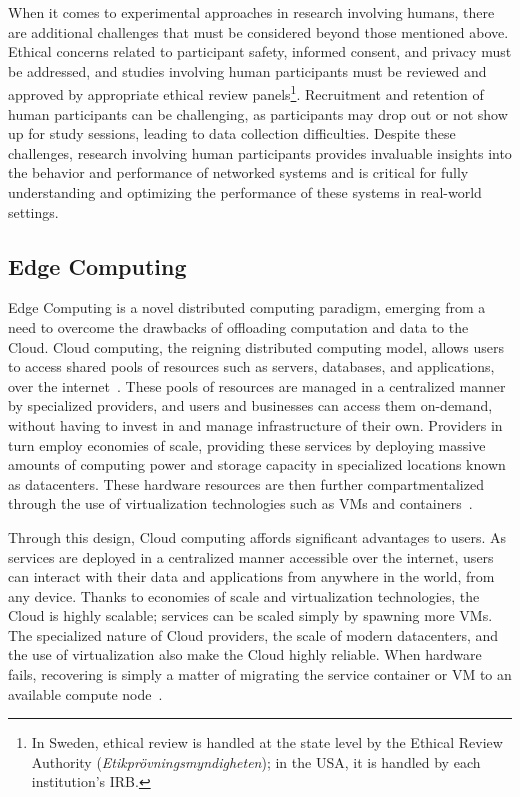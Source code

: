 When it comes to experimental approaches in research involving humans, there are additional challenges that must be considered beyond those mentioned above.
Ethical concerns related to participant safety, informed consent, and privacy must be addressed, and studies involving human participants must be reviewed and approved by appropriate ethical review panels\footnote{%
    In Sweden, ethical review is handled at the state level by the Ethical Review Authority (\emph{Etikprövningsmyndigheten}); in the \acs{USA}, it is handled by each institution's \gls{IRB}.
}.
Recruitment and retention of human participants can be challenging, as participants may drop out or not show up for study sessions, leading to data collection difficulties.
Despite these challenges, research involving human participants provides invaluable insights into the behavior and performance of networked systems and is critical for fully understanding and optimizing the performance of these systems in real-world settings.

\subsection{Edge Computing}

Edge Computing is a novel distributed computing paradigm, emerging from a need to overcome the drawbacks of offloading computation and data to the Cloud.
Cloud computing, the reigning distributed computing model, allows users to access shared pools of resources such as servers, databases, and applications, over the internet~\cite{gai2012towards}.
These pools of resources are managed in a centralized manner by specialized providers, and users and businesses can access them on-demand, without having to invest in and manage infrastructure of their own.
Providers in turn employ economies of scale, providing these services by deploying massive amounts of computing power and storage capacity in specialized locations known as datacenters.
These hardware resources are then further compartmentalized through the use of virtualization technologies such as \glspl{VM} and containers~\cite{gai2012towards}.

Through this design, Cloud computing affords significant advantages to users.
As services are deployed in a centralized manner accessible over the internet, users can interact with their data and applications from anywhere in the world, from any device.
Thanks to economies of scale and virtualization technologies, the Cloud is highly scalable;
services can be scaled simply by spawning more \glspl{VM}.
The specialized nature of Cloud providers, the scale of modern datacenters, and the use of virtualization also make the Cloud highly reliable.
When hardware fails, recovering is simply a matter of migrating the service container or \gls{VM} to an available compute node~\cite{endo2016high}.

